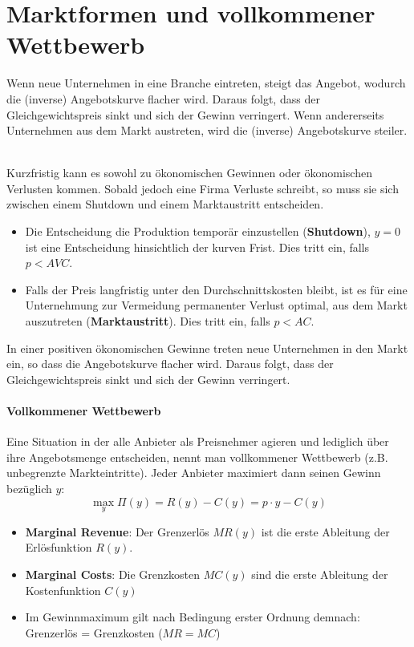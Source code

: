 \chapter{Marktformen und vollkommener Wettbewerb}

Wenn neue Unternehmen in eine Branche eintreten, steigt das Angebot, wodurch die (inverse) Angebotskurve flacher wird. Daraus folgt, dass der Gleichgewichtspreis sinkt und sich der Gewinn verringert. Wenn andererseits Unternehmen aus dem Markt austreten, wird die (inverse) Angebotskurve steiler. ~\smallskip

Kurzfristig kann es sowohl zu ökonomischen Gewinnen oder ökonomischen Verlusten kommen. Sobald jedoch eine Firma Verluste schreibt, so muss sie sich zwischen einem Shutdown und einem Marktaustritt entscheiden.
\begin{itemize}
	\item Die Entscheidung die Produktion temporär einzustellen (\textbf{Shutdown}), $y = 0$ ist eine Entscheidung hinsichtlich der kurven Frist. Dies tritt ein, falls $p < AVC$.
	\item Falls der Preis langfristig unter den Durchschnittskosten bleibt, ist es für eine Unternehmung zur Vermeidung permanenter Verlust optimal, aus dem Markt auszutreten (\textbf{Marktaustritt}). Dies tritt ein, falls $p < AC$.
\end{itemize}

In einer positiven ökonomischen Gewinne  treten neue Unternehmen in den Markt ein, so dass die Angebotskurve flacher wird. Daraus folgt, dass der Gleichgewichtspreis sinkt und sich der Gewinn verringert.

\subsubsection*{Vollkommener Wettbewerb}

Eine Situation in der alle Anbieter als Preisnehmer agieren und lediglich über ihre Angebotsmenge entscheiden, nennt man vollkommener Wettbewerb (z.B. unbegrenzte Markteintritte). Jeder Anbieter maximiert dann seinen Gewinn bezüglich $y$:
	$$ \max_y \Pi(y) = R(y) - C(y) = p \cdot y - C(y) $$
	
\begin{itemize}
	\item \textbf{Marginal Revenue}: Der Grenzerlös $MR(y)$ ist die erste Ableitung der Erlösfunktion $R(y)$.
	\item \textbf{Marginal Costs}: Die Grenzkosten $MC(y)$ sind die erste Ableitung der Kostenfunktion $C(y)$
	\item Im Gewinnmaximum gilt nach Bedingung erster Ordnung demnach: Grenzerlös = Grenzkosten ($MR = MC$)
\end{itemize}


